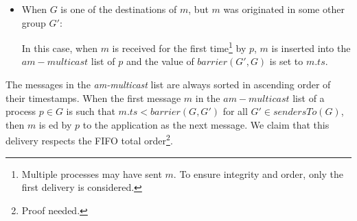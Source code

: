 \documentclass[times, 10pt]{article}
\begin{document}
\begin{itemize}
  
  \item When $G$ is one of the destinations of $m$, but $m$ was originated in some other group $G'$:
  
  In this case, when $m$ is received for the first time\footnote{Multiple processes may have sent $m$. To ensure integrity and order, only the first delivery is considered.} by $p$, $m$ is inserted into the $am-multicast$ list of $p$ and the value of $barrier(G',G)$ is set to $m.ts$.
\end{itemize}

The messages in the \textit{am-multicast} list are always sorted in ascending order of their timestamps. When the first message $m$ in the $am-multicast$ list of a process $p \in G$ is such that $m.ts < barrier(G, G')$ for all $G' \in sendersTo(G)$, then $m$ is \cons{}ed by $p$ to the application as the next message. We claim that this delivery respects the FIFO total order\footnote{Proof needed.}.

\end{document}

